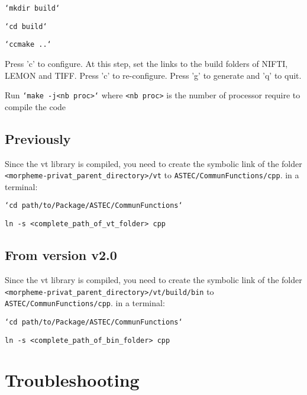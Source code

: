 \texttt{`mkdir build`}

\texttt{`cd build`}

\texttt{`ccmake ..`}

Press 'c' to configure. At this step, set the links to the build folders of NIFTI, LEMON and TIFF. Press 'c' to re-configure. Press 'g' to generate and 'q' to quit.

Run \texttt{`make -j<nb proc>`} where \texttt{<nb proc>} is the number of processor require to compile the code 
			
\subsection{Previously}
	    Since the vt library is compiled, you need to create the symbolic link of the folder \texttt{<morpheme-privat\_parent\_directory>/vt} to \texttt{ASTEC/CommunFunctions/cpp}.
 in a terminal:
 
 \texttt{`cd path/to/Package/ASTEC/CommunFunctions`}
 
 \texttt{ln -s <complete\_path\_of\_vt\_folder> cpp}

\subsection{From version v2.0}

	    Since the vt library is compiled, you need to create the symbolic link of the folder \texttt{<morpheme-privat\_parent\_directory>/vt/build/bin} to \texttt{ASTEC/CommunFunctions/cpp}.
in a terminal:

 \texttt{`cd path/to/Package/ASTEC/CommunFunctions`}
 
 \texttt{ln -s <complete\_path\_of\_bin\_folder> cpp}
 
 
 \section{Troubleshooting}



